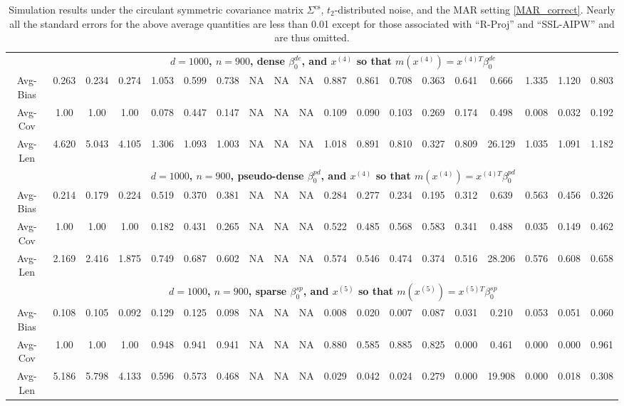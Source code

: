 \documentclass[ejsv2,noshowframe]{imsart}
\theoremstyle{plain}
\theoremstyle{definition}
\theoremstyle{remark}
\begin{document}
\begin{table}[hbtp!]
\begin{center}
{\begin{tabular}{ccccccccccccccccccc}
		& \multicolumn{18}{c}{\bf $d=1000$, $n = 900$, dense $\beta_0^{de}$, and $x^{(4)}$ so that $m(x^{(4)})=x^{(4)T}\beta_0^{de}$} \\ \cline{2-19}
		Avg-Bias & 0.263 & 0.234 & 0.274 & 1.053 & 0.599 & 0.738 & NA & NA & NA & 0.887 & 0.861 & 0.708 & 0.363 & 0.641 & 0.666 & 1.335 & 1.120 & 0.803 \\
		Avg-Cov & 1.00 & 1.00 & 1.00 & 0.078 & 0.447 & 0.147 & NA & NA & NA & 0.109 & 0.090 & 0.103 & 0.269 & 0.174 & 0.498 & 0.008 & 0.032 & 0.192 \\
		Avg-Len & 4.620 & 5.043 & 4.105 & 1.306 & 1.093 & 1.003 & NA & NA & NA & 1.018 & 0.891 & 0.810 & 0.327 & 0.809 & 26.129 & 1.035 & 1.091 & 1.182 \\
		\cline{2-19}
		
		& \multicolumn{18}{c}{\bf $d=1000$, $n = 900$, pseudo-dense $\beta_0^{pd}$, and $x^{(4)}$ so that $m(x^{(4)})=x^{(4)T}\beta_0^{pd}$} \\ \cline{2-19}
		Avg-Bias & 0.214 & 0.179 & 0.224 & 0.519 & 0.370 & 0.381 & NA & NA & NA & 0.284 & 0.277 & 0.234 & 0.195 & 0.312 & 0.639 & 0.563 & 0.456 & 0.326 \\
		Avg-Cov & 1.00 & 1.00 & 1.00 & 0.182 & 0.431 & 0.265 & NA & NA & NA & 0.522 & 0.485 & 0.568 & 0.583 & 0.341 & 0.488 & 0.035 & 0.149 & 0.462 \\
		Avg-Len & 2.169 & 2.416 & 1.875 & 0.749 & 0.687 & 0.602 & NA & NA & NA & 0.574 & 0.546 & 0.474 & 0.374 & 0.516 & 28.206 & 0.576 & 0.608 & 0.658 \\
		\hline
		
		& \multicolumn{18}{c}{\bf $d=1000$, $n = 900$, sparse $\beta_0^{sp}$, and $x^{(5)}$ so that $m(x^{(5)})=x^{(5)T}\beta_0^{sp}$} \\ \cline{2-19}
		Avg-Bias & 0.108 & 0.105 & 0.092 & 0.129 & 0.125 & 0.098 & NA & NA & NA & 0.008 & 0.020 & 0.007 & 0.087 & 0.031 & 0.210 & 0.053 & 0.051 & 0.060 \\
		Avg-Cov & 1.00 & 1.00 & 1.00 & 0.948 & 0.941 & 0.941 & NA & NA & NA & 0.880 & 0.585 & 0.885 & 0.825 & 0.000 & 0.461 & 0.000 & 0.000 & 0.961 \\
		Avg-Len & 5.186 & 5.798 & 4.133 & 0.596 & 0.573 & 0.468 & NA & NA & NA & 0.029 & 0.042 & 0.024 & 0.279 & 0.000 & 19.908 & 0.000 & 0.018 & 0.308 \\
		\hline\hline
\end{tabular}}
\caption{Simulation results under the circulant symmetric covariance matrix $\Sigma^{\mathrm{cs}}$, $t_2$-distributed noise, and the MAR setting \eqref{MAR_correct}. Nearly all the standard errors for the above average quantities are less than 0.01 except for those associated with ``R-Proj'' and ``SSL-AIPW'' and are thus omitted.}
\label{table:cirsym_MAR_terr_res}
\end{center}
\end{table}
\end{document}
